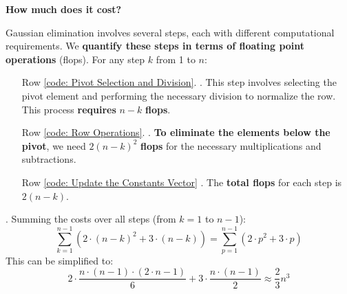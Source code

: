 \highspace
\begin{flushleft}
    \textcolor{Red2}{ \textbf{How much does it cost?}}
\end{flushleft}
Gaussian elimination involves several steps, each with different computational requirements. We \textbf{quantify these steps in terms of floating point operations} (flops). For any step $k$ from 1 to $n$:
\begin{itemize}
    \item[Row \ref{code: Pivot Selection and Division}.] . This step involves selecting the pivot element and performing the necessary division to normalize the row. This process \textbf{requires} $n - k$ \textbf{flops}.

    \item[Row \ref{code: Row Operations}.] . \textbf{To eliminate the elements below the pivot}, we need $2\left(n - k\right)^{2}$ \textbf{flops} for the necessary multiplications and subtractions.

    \item[Row \ref{code: Update the Constants Vector}] . The \textbf{total flops} for each step is $2\left(n - k\right)$.
\end{itemize}
. Summing the costs over all steps (from $k = 1$ to $n - 1$):
\begin{equation*}
    \sum_{k=1}^{n-1} \left(2 \cdot \left(n - k\right)^{2} + 3 \cdot \left(n - k\right)\right) = \sum_{p=1}^{n-1} \left(2 \cdot p^{2} + 3 \cdot p\right)
\end{equation*}
This can be simplified to:
\begin{equation*}
    2 \cdot \dfrac{n \cdot \left(n-1\right)\cdot\left(2 \cdot n-1\right)}{6} + 3 \cdot \frac{n \cdot \left(n-1\right)}{2} \approx \frac{2}{3} n^{3}
\end{equation*}

\newpage

